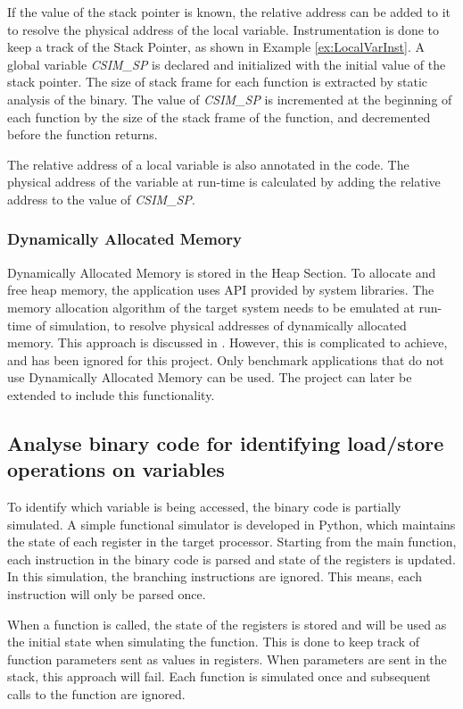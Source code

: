 If the value of the stack pointer is known, the relative address can be added to it to resolve the physical address of the local variable. Instrumentation is done to keep a track of the Stack Pointer, as shown in Example \ref{ex:LocalVarInst}. A global variable \emph{CSIM\_SP} is declared and initialized with the initial value of the stack pointer. The size of stack frame for each function is extracted by static analysis of the binary. The value of \emph{CSIM\_SP} is incremented at the beginning of each function by the size of the stack frame of the function, and decremented before the function returns.

The relative address of a local variable is also annotated in the code. The physical address of the variable at run-time is calculated by adding the relative address to the value of \emph{CSIM\_SP}.

\subsubsection{Dynamically Allocated Memory}
Dynamically Allocated Memory is stored in the Heap Section. To allocate and free heap memory, the application uses API provided by system libraries. The memory allocation algorithm of the target system needs to be emulated at run-time of simulation, to resolve physical addresses of dynamically allocated memory. This approach is discussed in \cite{Lu2013}. However, this is complicated to achieve, and has been ignored for this project. Only benchmark applications that do not use Dynamically Allocated Memory can be used. The project can later be extended to include this functionality.

\subsection{Analyse binary code for identifying load/store operations on variables}
\label{subsec:analyseBinary}
To identify which variable is being accessed, the binary code is partially simulated. A simple functional simulator is developed in Python, which maintains the state of each register in the target processor. Starting from the main function, each instruction in the binary code is parsed and state of the registers is updated. In this simulation, the branching instructions are ignored. This means, each instruction will only be parsed once. 

When a function is called, the state of the registers is stored and will be used as the initial state when simulating the function. This is done to keep track of function parameters sent as values in registers. When parameters are sent in the stack, this approach will fail. Each function is simulated once and subsequent calls to the function are ignored.

